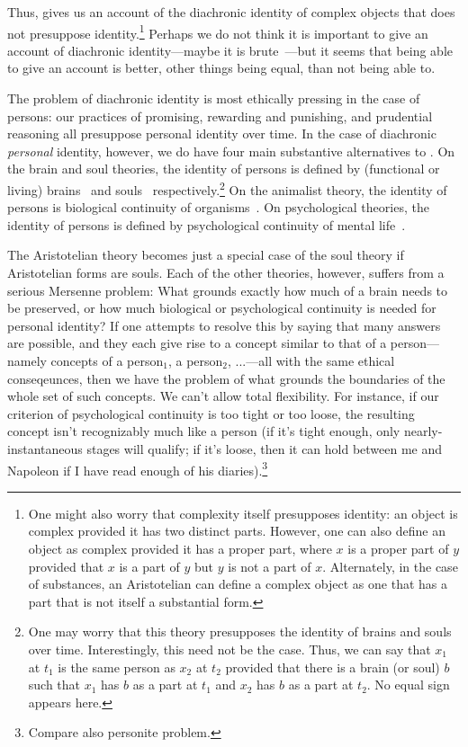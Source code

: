 Thus,  gives us an account of the diachronic identity of complex objects
that does not presuppose identity.\footnote{One might also worry that complexity itself
presupposes identity: an object is complex provided it has two distinct parts. However,
one can also define an object as complex provided it has a proper part, where $x$ is 
a proper part of $y$ provided that $x$ is a part of $y$ but $y$ is not a part of $x$.
Alternately, in the case of substances, an Aristotelian can define a complex object as 
one that has a part that is not itself a substantial form.} Perhaps we do not think it is
important to give an account of diachronic identity---maybe it is brute~\parencite{MerricksBrute,PrussIdentity}---but it seems that
being able to give an account is better, other things being equal, than not being able to.

The problem of diachronic identity is most ethically pressing in the case of persons: our 
practices of promising, rewarding and punishing, and prudential reasoning 
all presuppose personal identity over time. In the case of diachronic \textit{personal} identity, however,
we do have four main substantive alternatives to . On the brain and soul theories, the
identity of persons is defined by (functional or living) brains~\parencite{CampbellMcMahan} and souls~\parencite{SwinburneSoul1997} respectively.\footnote{One may worry that 
this theory presupposes the identity of brains and souls over time. Interestingly, this need not be the 
case. Thus, we can say that $x_1$ at $t_1$ is the same person as $x_2$ at $t_2$ provided that there is
a brain (or soul) $b$ such that $x_1$ has $b$ as a part at $t_1$ and $x_2$ has $b$ as a part at $t_2$.
No equal sign appears here.} On the animalist 
theory, the identity
of persons is biological continuity of organisms~\parencite{OlsonHuman,ThorntonVarieties}. On psychological theories, the identity of
persons is defined by psychological continuity of mental life~\parencite{ShoemakerIdentity,ParfitIdentity}.

The Aristotelian theory becomes just a special case of the soul theory if Aristotelian forms are souls.
Each of the other theories, however, suffers from a serious Mersenne problem: What grounds exactly how much
of a brain needs to be preserved, or how much biological or psychological continuity is needed for 
personal identity? If one attempts to resolve this by saying that many answers are possible, and they
each give rise to a concept similar to that of a person---namely concepts of a person$_1$, a person$_2$, ...---all with
the same ethical conseqeunces, then we have the problem of what grounds the boundaries of the whole set of
such concepts. We can't allow total flexibility. For instance, if our criterion of psychological continuity is too tight or too loose, the resulting concept
isn't recognizably much like a person (if it's tight enough, only nearly-instantaneous stages will
qualify; if it's loose, then it can hold between me and Napoleon if I have read enough of his diaries).\footnote{Compare
also  personite problem.} 

